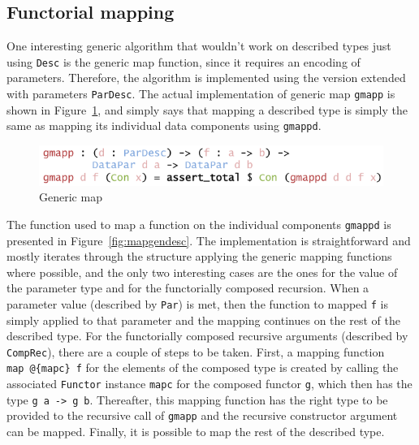\documentclass{ituthesis}
\newcommand{\ttconstructor}[1]{\textcolor{constructor-color}{\texttt{#1}}}
\newcommand{\tttype}[1]{\textcolor{type-color}{\texttt{#1}}}
\newcommand{\ttdec}[1]{\textcolor{declared-var-color}{\texttt{#1}}}
\newcommand{\ttvar}[1]{\textcolor{local-var-color}{\texttt{#1}}}
\theoremstyle{break}
\begin{document}
\subsection{Functorial mapping}
\label{sub:Functorial mapping}
One interesting generic algorithm that wouldn't work on described types just using \tttype{Desc} is the generic map function, since it requires
an encoding of parameters.
Therefore, the algorithm is implemented using the version extended with parameters \tttype{ParDesc}.
The actual implementation of generic map \ttdec{gmapp} is shown in Figure~\ref{fig:mapgen}, and simply says that
mapping a described type is simply the same as mapping its individual data components using \ttdec{gmappd}.

\begin{figure}[ht]
\begin{center}
    \includegraphics[scale=0.5]{Figures/GenericMap.png}
\end{center}
\caption{Generic map}
\label{fig:mapgen}
\end{figure}

The function used to map a function on the individual components \ttdec{gmappd} is presented in Figure~\ref{fig:mapgendesc}.
The implementation is straightforward and mostly iterates through the structure applying the generic mapping functions where possible, and the only two interesting cases are the ones for the value of the parameter type
and for the functorially composed recursion.
When a parameter value (described by \ttconstructor{Par}) is met, then the function to mapped \ttvar{f} is simply applied to that parameter and the mapping continues on the rest of the described type.
For the functorially composed recursive arguments (described by \ttconstructor{CompRec}), there are a couple of steps to be taken.
First, a mapping function \ttdec{map}~\texttt{@\{}\ttvar{mapc}\texttt{\}}~\ttvar{f} for the elements of the composed type is created by calling the associated \ttvar{Functor} instance \ttvar{mapc} for the composed functor \ttvar{g}, which then has the type \ttvar{g}~\ttvar{a}~\texttt{->}~\ttvar{g}~\ttvar{b}.
Thereafter, this mapping function has the right type to be provided to the recursive call of \ttdec{gmapp} and the recursive constructor argument can be mapped.
Finally, it is possible to map the rest of the described type.
\end{document}
